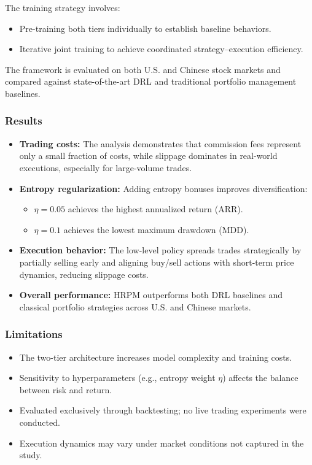 \documentclass[12pt,a4paper]{report}
\begin{document}
The training strategy involves:
\begin{itemize}
    \item Pre-training both tiers individually to establish baseline behaviors.  
    \item Iterative joint training to achieve coordinated strategy–execution efficiency.  
\end{itemize}

The framework is evaluated on both U.S. and Chinese stock markets and compared against state-of-the-art DRL and traditional portfolio management baselines.

\subsubsection{Results}
\begin{itemize}
    \item \textbf{Trading costs:} The analysis demonstrates that commission fees represent only a small fraction of costs, while slippage dominates in real-world executions, especially for large-volume trades.  
    \item \textbf{Entropy regularization:} Adding entropy bonuses improves diversification:  
    \begin{itemize}
        \item $\eta = 0.05$ achieves the highest annualized return (ARR).  
        \item $\eta = 0.1$ achieves the lowest maximum drawdown (MDD).  
    \end{itemize}
    \item \textbf{Execution behavior:} The low-level policy spreads trades strategically by partially selling early and aligning buy/sell actions with short-term price dynamics, reducing slippage costs.  
    \item \textbf{Overall performance:} HRPM outperforms both DRL baselines and classical portfolio strategies across U.S. and Chinese markets.  
\end{itemize}

\subsubsection{Limitations}
\begin{itemize}
    \item The two-tier architecture increases model complexity and training costs.  
    \item Sensitivity to hyperparameters (e.g., entropy weight $\eta$) affects the balance between risk and return.  
    \item Evaluated exclusively through backtesting; no live trading experiments were conducted.  
    \item Execution dynamics may vary under market conditions not captured in the study.  
\end{itemize}
\end{document}
